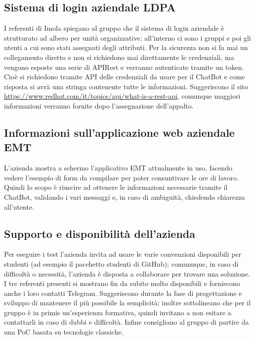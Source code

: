 \subsection{Sistema di login aziendale LDPA}
I referenti di Imola spiegano al gruppo che il sistema di login aziendale è strutturato ad albero 
per unità organizzative: all'interno ci sono i gruppi e poi gli utenti a cui sono stati assegnati degli attributi. 
Per la sicurezza non si fa mai un collegamento diretto e non si richiedono mai direttamente le credenziali,
ma vengono esposte una serie di APIRest e verranno autenticate tramite un token. 
Cioè si richiedono tramite API delle credenziali da usare per il ChatBot e come risposta si avrà 
una stringa contenente tutte le informazioni. Suggeriscono il sito 
\href{https://www.redhat.com/it/topics/api/what-is-a-rest-api}{https://www.redhat.com/it/topics/api/what-is-a-rest-api},
comunque maggiori informazioni verranno fornite dopo l'assegnazione dell'appalto.

\subsection{Informazioni sull'applicazione web aziendale EMT}
L'azienda mostra a schermo l'applicativo EMT attualmente in uso, facendo vedere l'esempio di form 
da compilare per poter consuntivare le ore di lavoro. Quindi lo scopo è riuscire 
ad ottenere le informazioni necessarie tramite il ChatBot, validando i vari messaggi e, in caso di ambiguità, chiedendo
chiarezza all'utente.

\subsection{Supporto e disponibilità dell'azienda}
Per eseguire i test l'azienda invita ad usare le varie convenzioni disponibili per studenti 
(ad esempio il pacchetto studenti di GitHub); comunuque, in caso di difficoltà o necessità, 
l'azienda è disposta a collaborare per trovare una soluzione.
I tre referenti presenti si mostrano fin da subito molto disponibili e forniscono
anche i loro contatti Telegram. \newline
Suggeriscono durante la fase di progettazione e sviluppo di mantenere il più possibile 
la semplicità; inoltre sottolineano che per il gruppo è in primis un'esperienza formativa, 
quindi invitano a non esitare a contattarli in caso di dubbi e difficoltà. 
Infine consigliano al gruppo di partire da una PoC basata su tecnologie classiche.

